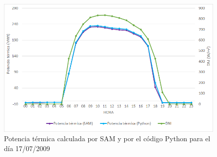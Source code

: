 \begin{figure}[!h]
\includegraphics[width=0.9\linewidth]{images/177potencia.png}
\caption{Potencia térmica calculada por SAM y por el código Python para el día 17/07/2009} 
\label{fig:177potencia}
\end{figure}

